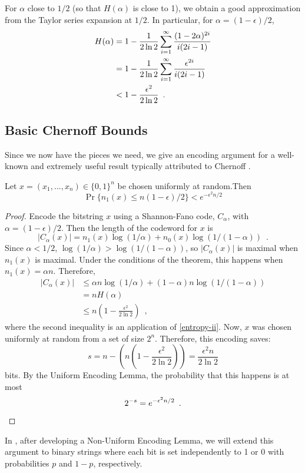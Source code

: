 \documentclass{patmorin}
\begin{document}
For $\alpha$ close to $1/2$ (so that $H(\alpha)$ is close to 1), we
obtain a good approximation from the Taylor series expansion at $1/2$. In
particular, for $\alpha=(1-\epsilon)/2$,
\begin{align}
   H(\alpha) & = 1-\frac{1}{2\ln 2}\sum_{i=1}^{\infty}\frac{(1-2\alpha)^{2i}}{i(2i-1)} 
            \notag \\ 
        & = 1-\frac{1}{2\ln 2}\sum_{i=1}^{\infty}\frac{\epsilon^{2i}}{i(2i-1)} 
             \notag \\ 
        & < 1-\frac{\epsilon^2}{2\ln 2} \enspace .\eqlabel{entropy-ii}
\end{align}

\subsection{Basic Chernoff Bounds}

Since we now have the pieces we need, we give an encoding argument
for a well-known and extremely useful result typically attributed to
Chernoff \cite{X}.

\begin{thm}\label{chernoff-basic}
  Let $x=(x_1,\ldots,x_n)\in\{0,1\}^n$ be chosen uniformly at
  random.Then
  \[  \Pr\{n_1(x) \le n(1-\epsilon)/2\} < e^{-\epsilon^2n/2} \]
\end{thm}

\begin{proof}
Encode the bitstring $x$ using a Shannon-Fano code, $C_\alpha$, with
$\alpha=(1-\epsilon)/2$.  Then the length of the codeword for $x$ is
\[
     |C_\alpha(x)| = n_1(x)\log(1/\alpha) + n_0(x)\log (1/(1-\alpha))  \enspace .
\]
Since $\alpha < 1/2$, $\log(1/\alpha) > \log(1/(1-\alpha))$, so
$|C_\alpha(x)|$ is maximal when $n_1(x)$ is maximal.  Under the conditions
of the theorem, this happens when $n_1(x)=\alpha n$.  Therefore,
\begin{align*}
  |C_\alpha(x)| & \le \alpha n\log(1/\alpha) + (1-\alpha)n\log(1/(1-\alpha))\\
                & = n H(\alpha) \\
                & \le n\left(1-\frac{\epsilon^2}{2\ln 2}\right) \enspace ,
\end{align*}
where the second inequality is an application of \eqref{entropy-ii}.
Now, $x$ was chosen uniformly at random from a set of size $2^n$.
Therefore, this encoding saves:
\[  
    s = n-\left(n\left(1-\frac{\epsilon^2}{2\ln 2}\right)\right)
      = \frac{\epsilon^2n}{2\ln 2} 
\]
bits.  By the Uniform Encoding Lemma, the probability that this happens
is at most
\[
     2^{-s} = e^{-\epsilon^2n/2} \enspace . \qedhere
\]
\end{proof}
In , after developing a Non-Uniform Encoding Lemma,
we will extend this argument to binary strings where each bit is set
independently to 1 or 0 with probabilities $p$ and $1-p$, respectively.
\end{document}

